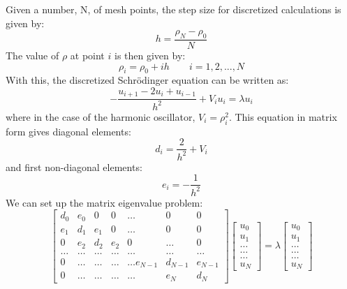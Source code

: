 \documentclass[10pt,showpacs,preprintnumbers,amsmath,amssymb,aps,prl,twocolumn,groupedaddress,superscriptaddress,showkeys]{revtex4-1}
\begin{document}
Given a number, N, of mesh points, the step size for discretized calculations is given by:
\begin{equation}
	 h = \frac{\rho_N-\rho_0}{N}
\end{equation}
The value of $\rho$ at point $i$ is then given by:
\begin{equation}
\rho_i = \rho_0+ih \qquad i = 1,2, ... ,N
\end{equation}
With this, the discretized Schr\"{o}dinger equation can be written as:
\begin{equation}
-\frac{u_{i+1}-2u_i+u_{i-1}}{h^2}+V_i u_i = \lambda u_i
\end{equation}
where in the case of the harmonic oscillator, $V_i = \rho_i^2$. This equation in matrix form gives diagonal elements:
\begin{equation}
d_i = \frac{2}{h^2}+V_i
\end{equation}
and first non-diagonal elements:
\begin{equation}
e_i = -\frac{1}{h^2}
\end{equation}
We can set up the matrix eigenvalue problem:
\begin{equation*}
    \begin{bmatrix}d_0 & e_0 & 0   & 0    & \dots  &0     & 0 \\
                                e_1 & d_1 & e_1 & 0    & \dots  &0     &0 \\
                                0   & e_2 & d_2 & e_2  &0       &\dots & 0\\
                                \dots  & \dots & \dots & \dots  &\dots      &\dots & \dots\\
                                0   & \dots & \dots & \dots  &\dots  e_{N-1}     &d_{N-1} & e_{N-1}\\
                                0   & \dots & \dots & \dots  &\dots       &e_{N} & d_{N}
             \end{bmatrix}   \begin{bmatrix} u_{0} \\
                                                                           u_{1} \\
                                                                           \dots\\ \dots\\ \dots\\
                                                                           u_{N}
                          \end{bmatrix}=\lambda \begin{bmatrix} u_{0} \\
                                                                           u_{1} \\
                                                                           \dots\\ \dots\\ \dots\\
                                                                           u_{N}
                          \end{bmatrix}
\end{equation*}
\end{document}
